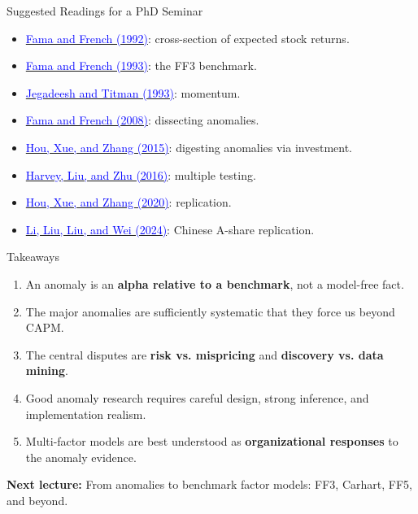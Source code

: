 \documentclass{beamer}
\begin{document}
\begin{frame}{Suggested Readings for a PhD Seminar}
	\begin{itemize}
		\item \href{https://doi.org/10.1111/j.1540-6261.1992.tb04398.x}{\textcolor{blue}{Fama and French (1992)}}: cross-section of expected stock returns.
		\item \href{https://doi.org/10.1016/0304-405X(93)90023-5}{\textcolor{blue}{Fama and French (1993)}}: the FF3 benchmark.
		\item \href{https://doi.org/10.1111/j.1540-6261.1993.tb04702.x}{\textcolor{blue}{Jegadeesh and Titman (1993)}}: momentum.
		\item \href{https://doi.org/10.1111/j.1540-6261.2008.01371.x}{\textcolor{blue}{Fama and French (2008)}}: dissecting anomalies.
		\item \href{https://doi.org/10.1093/rfs/hhu068}{\textcolor{blue}{Hou, Xue, and Zhang (2015)}}: digesting anomalies via investment.
		\item \href{https://doi.org/10.1093/rfs/hhv059}{\textcolor{blue}{Harvey, Liu, and Zhu (2016)}}: multiple testing.
		\item \href{https://doi.org/10.1093/rfs/hhy131}{\textcolor{blue}{Hou, Xue, and Zhang (2020)}}: replication.
		\item \href{https://doi.org/10.1287/mnsc.2023.4904}{\textcolor{blue}{Li, Liu, Liu, and Wei (2024)}}: Chinese A-share replication.
	\end{itemize}
\end{frame}

\begin{frame}{Takeaways}
	\begin{enumerate}
		\item An anomaly is an \textbf{alpha relative to a benchmark}, not a model-free fact.
		\item The major anomalies are sufficiently systematic that they force us beyond CAPM.
		\item The central disputes are \textbf{risk vs. mispricing} and \textbf{discovery vs. data mining}.
		\item Good anomaly research requires careful design, strong inference, and implementation realism.
		\item Multi-factor models are best understood as \textbf{organizational responses} to the anomaly evidence.
	\end{enumerate}

	\vspace{0.4cm}
	\centering
	\textbf{Next lecture:} From anomalies to benchmark factor models: FF3, Carhart, FF5, and beyond.
\end{frame}
\end{document}
